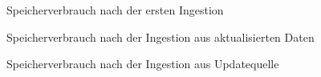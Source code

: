 \begin{figure}
    \centering
    \label{fig:eval-storage-i}
    
    \caption{Speicherverbrauch nach der ersten Ingestion}
\end{figure}

\begin{figure}
    \centering
    \label{fig:eval-storage-u}
    
    \caption{Speicherverbrauch nach der Ingestion aus aktualisierten Daten}
\end{figure}

\begin{figure}
    \centering
    \label{fig:eval-storage-c}
    
    \caption{Speicherverbrauch nach der Ingestion aus Updatequelle}
\end{figure}